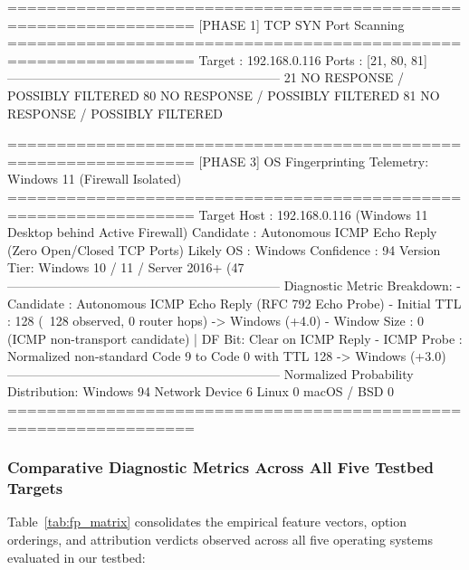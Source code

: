 \begin{logbox}
=================================================================
  [PHASE 1] TCP SYN Port Scanning
=================================================================
  Target      : 192.168.0.116
  Ports       : [21, 80, 81]
-----------------------------------------------------------------
     21  NO RESPONSE / POSSIBLY FILTERED
     80  NO RESPONSE / POSSIBLY FILTERED
     81  NO RESPONSE / POSSIBLY FILTERED

=================================================================
  [PHASE 3] OS Fingerprinting Telemetry: Windows 11 (Firewall Isolated)
=================================================================
  Target Host : 192.168.0.116 (Windows 11 Desktop behind Active Firewall)
  Candidate   : Autonomous ICMP Echo Reply (Zero Open/Closed TCP Ports)
  Likely OS   : Windows                   Confidence : 94%
  Version Tier: Windows 10 / 11 / Server 2016+ (47%
-----------------------------------------------------------------
  Diagnostic Metric Breakdown:
    - Candidate   : Autonomous ICMP Echo Reply (RFC 792 Echo Probe)
    - Initial TTL : 128 (~128 observed, 0 router hops) -> Windows (+4.0)
    - Window Size : 0 (ICMP non-transport candidate) | DF Bit: Clear on ICMP Reply
    - ICMP Probe  : Normalized non-standard Code 9 to Code 0 with TTL 128 -> Windows (+3.0)
-----------------------------------------------------------------
  Normalized Probability Distribution:
    Windows           94%
    Network Device     6%
    Linux              0%
    macOS / BSD        0%
=================================================================
\end{logbox}

\subsubsection{Comparative Diagnostic Metrics Across All Five Testbed Targets}
Table~\ref{tab:fp_matrix} consolidates the empirical feature vectors, option orderings, and attribution verdicts observed across all five operating systems evaluated in our testbed:

